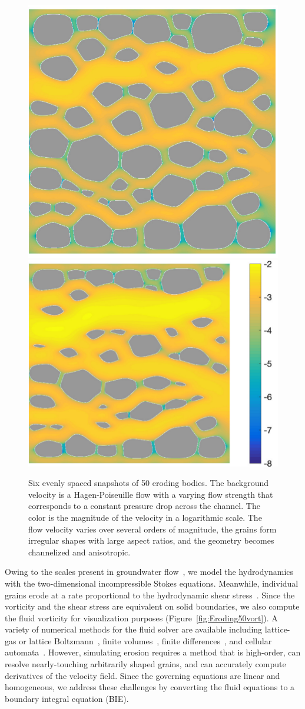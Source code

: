 \documentclass[preprint,10pt]{elsarticle}
\begin{document}
\begin{figure}[H]
\begin{center}
\includegraphics[height = 0.31 \textwidth]{./figs/vel_log_50b320}
\includegraphics[height = 0.31 \textwidth]{./figs/vel_log_50b400}
\caption{\label{fig:Eroding50vel} Six evenly spaced snapshots of 50
eroding bodies.  The background velocity is a Hagen-Poiseuille flow with
a varying flow strength that corresponds to a constant pressure drop
across the channel. The color is the magnitude of the velocity in a
logarithmic scale. The flow velocity varies over several orders of
magnitude, the grains form irregular shapes with large aspect ratios,
and the geometry becomes channelized and anisotropic.}
\end{center}
\end{figure}

Owing to the scales present in groundwater flow~\cite{bea1972}, we model
the hydrodynamics with the two-dimensional incompressible Stokes
equations.  Meanwhile, individual grains erode at a rate proportional to
the hydrodynamic shear stress~\cite{wan-fel2004,
ris-moo-chi-she-zha2012, moore2013self, par-izu2000}.  Since the
vorticity and the shear stress are equivalent on solid boundaries, we
also compute the fluid vorticity for visualization purposes
(Figure~\ref{fig:Eroding50vort}).  A variety of numerical methods for
the fluid solver are available including lattice-gas or lattice
Boltzmann~\cite{kop-kat-tim1996, dar-mcc1998}, finite
volumes~\cite{suo-liu-gan2019, den-ica-hid2018,
sie-ili-pri-riv-gua2019}, finite differences~\cite{leb-ded-dav-bou2007,
knu-car2005}, and cellular automata~\cite{rot1988}.  However, simulating
erosion requires a method that is high-order, can resolve
nearly-touching arbitrarily shaped grains, and can accurately compute
derivatives of the velocity field.  Since the governing equations are
linear and homogeneous, we address these challenges by converting the
fluid equations to a boundary integral equation (BIE).
\end{document}
